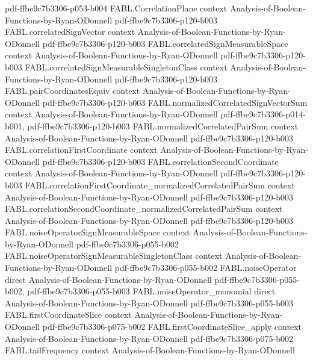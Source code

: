 \begin{theorem}
  {pdf-ffbe9c7b3306-p053-b004}
\proofstep
  {FABL.CorrelationPlane}
  {context}
  {Analysis-of-Boolean-Functions-by-Ryan-ODonnell}
  {pdf-ffbe9c7b3306-p120-b003}
\proofstep
  {FABL.correlatedSignVector}
  {context}
  {Analysis-of-Boolean-Functions-by-Ryan-ODonnell}
  {pdf-ffbe9c7b3306-p120-b003}
\proofstep
  {FABL.correlatedSignMeasurableSpace}
  {context}
  {Analysis-of-Boolean-Functions-by-Ryan-ODonnell}
  {pdf-ffbe9c7b3306-p120-b003}
\proofstep
  {FABL.correlatedSignMeasurableSingletonClass}
  {context}
  {Analysis-of-Boolean-Functions-by-Ryan-ODonnell}
  {pdf-ffbe9c7b3306-p120-b003}
\proofstep
  {FABL.pairCoordinatesEquiv}
  {context}
  {Analysis-of-Boolean-Functions-by-Ryan-ODonnell}
  {pdf-ffbe9c7b3306-p120-b003}
\proofstep
  {FABL.normalizedCorrelatedSignVectorSum}
  {context}
  {Analysis-of-Boolean-Functions-by-Ryan-ODonnell}
  {pdf-ffbe9c7b3306-p014-b001,
    pdf-ffbe9c7b3306-p120-b003}
\proofstep
  {FABL.normalizedCorrelatedPairSum}
  {context}
  {Analysis-of-Boolean-Functions-by-Ryan-ODonnell}
  {pdf-ffbe9c7b3306-p120-b003}
\proofstep
  {FABL.correlationFirstCoordinate}
  {context}
  {Analysis-of-Boolean-Functions-by-Ryan-ODonnell}
  {pdf-ffbe9c7b3306-p120-b003}
\proofstep
  {FABL.correlationSecondCoordinate}
  {context}
  {Analysis-of-Boolean-Functions-by-Ryan-ODonnell}
  {pdf-ffbe9c7b3306-p120-b003}
\proofstep
  {FABL.correlationFirstCoordinate_normalizedCorrelatedPairSum}
  {context}
  {Analysis-of-Boolean-Functions-by-Ryan-ODonnell}
  {pdf-ffbe9c7b3306-p120-b003}
\proofstep
  {FABL.correlationSecondCoordinate_normalizedCorrelatedPairSum}
  {context}
  {Analysis-of-Boolean-Functions-by-Ryan-ODonnell}
  {pdf-ffbe9c7b3306-p120-b003}
\proofstep
  {FABL.noiseOperatorSignMeasurableSpace}
  {context}
  {Analysis-of-Boolean-Functions-by-Ryan-ODonnell}
  {pdf-ffbe9c7b3306-p055-b002}
\proofstep
  {FABL.noiseOperatorSignMeasurableSingletonClass}
  {context}
  {Analysis-of-Boolean-Functions-by-Ryan-ODonnell}
  {pdf-ffbe9c7b3306-p055-b002}
\proofstep
  {FABL.noiseOperator}
  {direct}
  {Analysis-of-Boolean-Functions-by-Ryan-ODonnell}
  {pdf-ffbe9c7b3306-p055-b002,
    pdf-ffbe9c7b3306-p055-b003}
\proofstep
  {FABL.noiseOperator_monomial}
  {direct}
  {Analysis-of-Boolean-Functions-by-Ryan-ODonnell}
  {pdf-ffbe9c7b3306-p055-b003}
\proofstep
  {FABL.firstCoordinateSlice}
  {context}
  {Analysis-of-Boolean-Functions-by-Ryan-ODonnell}
  {pdf-ffbe9c7b3306-p075-b002}
\proofstep
  {FABL.firstCoordinateSlice_apply}
  {context}
  {Analysis-of-Boolean-Functions-by-Ryan-ODonnell}
  {pdf-ffbe9c7b3306-p075-b002}
\proofstep
  {FABL.tailFrequency}
  {context}
  {Analysis-of-Boolean-Functions-by-Ryan-ODonnell}

\end{theorem}
